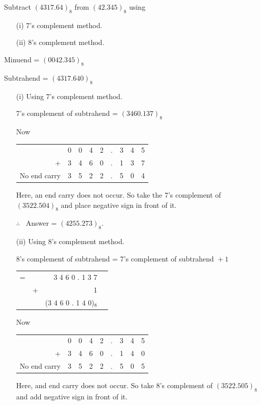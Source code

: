 \begin{problem}\label{prob5.38}
Subtract $(4317.64)_{8}$ from $(42.345)_{8}$ using
\begin{itemize}
\item[(i)] 7's complement method.

\item[(ii)] 8's complement method.
\end{itemize}
\end{problem}

\begin{solution}
Minuend = $(0042.345)_{8}$

\qquad\!Subtrahend = $(4317.640)_{8}$
\begin{itemize}
\item[(i)] Using 7's complement method.

7's complement of subtrahend = $(3460.137)_{8}$

Now
\begin{center}
\begin{tabular}{rcccccccc}
 & 0 & 0 & 4 & 2 & . & 3 & 4 & 5\\
+ & 3 & 4 & 6 & 0 & . & 1 & 3 & 7\\
\cline{2-8}
No end carry & 3 & 5 & 2 & 2 & . & 5 & 0 & 4
\end{tabular}
\end{center}
Here, an end carry does not occur. So take the 7's complement of $(3522.504)_{8}$ and place negative sign in front of it.

$\therefore$~ Answer = $(4255.273)_{8}$.

\item[(ii)] Using 8's complement method.

8's complement of subtrahend = 7's complement of subtrahend ${}+1$
\begin{center}
\begin{tabular}{rrrc@{\hspace{.22cm}}}
= && 3  4  6  0  .  1  3  7 &\\
& + & 1&\\
\cline{3-3}
 && (3 4 6 0 . 1 4 0)$_{8}$\!\!\!\! & 
\end{tabular}
\end{center}

Now
\begin{center}
\tabcolsep=4pt
\begin{tabular}{rcccccccc}
 & 0 & 0 & 4 & 2 & . & 3 & 4 & 5\\
+ & 3 & 4 & 6 & 0 & . & 1 & 4 & 0\\
\cline{2-9}
No end carry & 3 & 5 & 2 & 2 & . & 5 & 0 & 5
\end{tabular}
\end{center}
Here, and end carry does not occur. So take 8's complement of $(3522.505)_{8}$ and add negative sign in front of it.


\end{itemize}
\end{solution}
